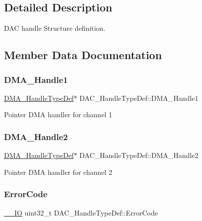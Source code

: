 \subsection{Detailed Description}
D\+AC handle Structure definition. 

\subsection{Member Data Documentation}
\mbox{\label{struct_d_a_c___handle_type_def_afaf7fe475f68a08ab6d832c871c5dc10}} 
\subsubsection{\texorpdfstring{DMA\_Handle1}{DMA\_Handle1}}
{\footnotesize\ttfamily \mbox{\hyperlink{group___d_m_a___exported___types_ga41b754a906b86bce54dc79938970138b}{D\+M\+A\+\_\+\+Handle\+Type\+Def}}$\ast$ D\+A\+C\+\_\+\+Handle\+Type\+Def\+::\+D\+M\+A\+\_\+\+Handle1}

Pointer D\+MA handler for channel 1 \mbox{\label{struct_d_a_c___handle_type_def_a67d937ab82140720a9aa7c57c5d1ef5a}} 
\subsubsection{\texorpdfstring{DMA\_Handle2}{DMA\_Handle2}}
{\footnotesize\ttfamily \mbox{\hyperlink{group___d_m_a___exported___types_ga41b754a906b86bce54dc79938970138b}{D\+M\+A\+\_\+\+Handle\+Type\+Def}}$\ast$ D\+A\+C\+\_\+\+Handle\+Type\+Def\+::\+D\+M\+A\+\_\+\+Handle2}

Pointer D\+MA handler for channel 2 \mbox{\label{struct_d_a_c___handle_type_def_ae0b1350155ba53babd8797c4e0c8bd0b}} 
\subsubsection{\texorpdfstring{ErrorCode}{ErrorCode}}
{\footnotesize\ttfamily \mbox{\hyperlink{core__sc300_8h_aec43007d9998a0a0e01faede4133d6be}{\+\_\+\+\_\+\+IO}} uint32\+\_\+t D\+A\+C\+\_\+\+Handle\+Type\+Def\+::\+Error\+Code}


